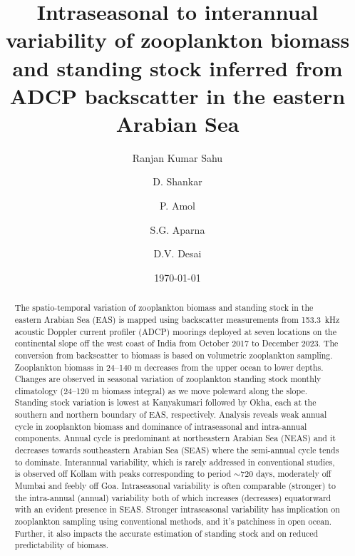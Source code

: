 \documentclass[authoryear,review,12pt]{elsarticle}
\date{\today}
\begin{document}
		\begin{frontmatter}
		\title{Intraseasonal to interannual variability of zooplankton biomass and standing   stock inferred from ADCP backscatter in the eastern Arabian Sea}

		\address[inst1]{organization={CSIR-National Institute of Oceanography}, 
			addressline={Dona Paula},
			postcode={403004},
		state={Goa},
		country={India}}

		\address[inst2]{organization={Academy of Scientific and Innovative Research (AcSIR)}, 
		addressline={Ghaziabad},
		postcode={201002},
		state={Uttar~Pradesh},
		country={India}}

		\address[inst3]{organization={CSIR-NIO, Regional Centre}, 
		addressline={Visakhapatnam},
		postcode={530017},
		state={Andhra Pradesh},
		country={India}}


\author[inst1,inst2]{Ranjan Kumar Sahu}
\author[inst1,inst2]{D. Shankar}
\author[inst2,inst3]{P. Amol}
\author[inst1,inst2]{S.G. Aparna}
\author[inst1,inst2]{D.V. Desai}


	\begin{abstract}

	The spatio-temporal variation of zooplankton biomass and standing stock in the eastern Arabian Sea (EAS) is mapped using backscatter measurements from 153.3~kHz acoustic Doppler current profiler (ADCP) moorings deployed at seven locations on the continental slope off the west coast of India from October 2017 to December 2023. The conversion from backscatter to biomass is based on volumetric zooplankton sampling. Zooplankton biomass in 24--140 m decreases from the upper ocean to lower depths. Changes are observed in seasonal variation of zooplankton standing stock monthly climatology (24--120 m biomass  integral) as we move poleward along the slope.  Standing stock variation is lowest at Kanyakumari followed by Okha, each at the southern and northern boundary of EAS, respectively. Analysis reveals weak annual cycle in zooplankton biomass and dominance of intraseasonal and intra-annual components. Annual cycle is predominant at northeastern Arabian Sea (NEAS) and it decreases towards southeastern Arabian Sea (SEAS) where the semi-annual cycle tends to dominate. Interannual variability, which is rarely addressed in conventional studies, is observed off Kollam with peaks corresponding to period $\sim$720 days, moderately off Mumbai and feebly off Goa. Intraseasonal variability is often comparable (stronger) to the intra-annual (annual) variability both of which increases (decreases) equatorward with an evident presence in SEAS. Stronger intraseasonal variability has implication on zooplankton sampling using conventional methods, and it’s patchiness in open ocean. Further, it also impacts the accurate estimation of standing stock and on reduced predictability of biomass.


\end{abstract}
\end{frontmatter}
\end{document}
